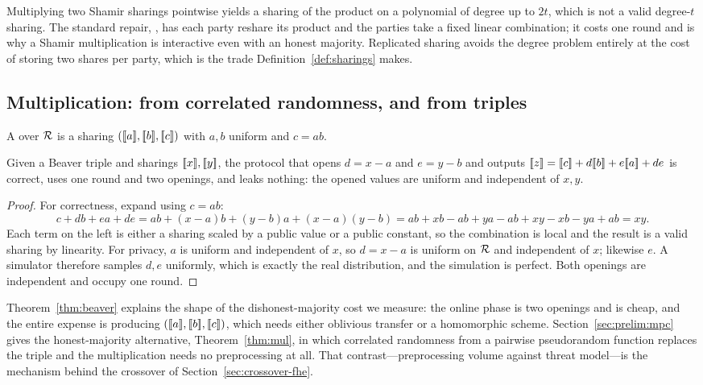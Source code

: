 \begin{remark}
\label{rem:degree}
Multiplying two Shamir sharings pointwise yields a sharing of the product on a
polynomial of degree up to $2t$, which is not a valid degree-$t$ sharing. The
standard repair, , has each party reshare its product and
the parties take a fixed linear combination; it costs one round and is why a
Shamir multiplication is interactive even with an honest majority. Replicated
sharing avoids the degree problem entirely at the cost of storing two shares per
party, which is the trade Definition~\ref{def:sharings} makes.
\end{remark}

\subsection{Multiplication: from correlated randomness, and from triples}
\label{sec:found:mul}

\begin{definition}
\label{def:beaver}
A  over $\mathcal{R}$ is a sharing $([\![a]\!],[\![b]\!],[\![c]\!])$ with
$a,b$ uniform and $c = ab$.
\end{definition}

\begin{theorem}
\label{thm:beaver}
Given a Beaver triple and sharings $[\![x]\!],[\![y]\!]$, the protocol that opens
$d = x - a$ and $e = y - b$ and outputs
$\shr{z} = \shr{c} + d\shr{b} + e\shr{a} + de$
is correct, uses one round and two openings, and leaks nothing: the opened values
are uniform and independent of $x,y$.
\end{theorem}

\begin{proof}
For correctness, expand using $c = ab$:
\[
  c + db + ea + de = ab + (x-a)b + (y-b)a + (x-a)(y-b)
  = ab + xb - ab + ya - ab + xy - xb - ya + ab = xy .
\]
Each term on the left is either a sharing scaled by a public value or a public
constant, so the combination is local and the result is a valid sharing by
linearity. For privacy, $a$ is uniform and independent of $x$, so $d = x-a$ is
uniform on $\mathcal{R}$ and independent of $x$; likewise $e$. A simulator therefore
samples $d,e$ uniformly, which is exactly the real distribution, and the
simulation is perfect. Both openings are independent and occupy one round.
\end{proof}

Theorem~\ref{thm:beaver} explains the shape of the dishonest-majority cost we
measure: the online phase is two openings and is cheap, and the entire expense is
producing $([\![a]\!],[\![b]\!],[\![c]\!])$, which needs either oblivious transfer or a
homomorphic scheme. Section~\ref{sec:prelim:mpc} gives the honest-majority
alternative, Theorem~\ref{thm:mul}, in which correlated randomness from a pairwise
pseudorandom function replaces the triple and the multiplication needs no
preprocessing at all. That contrast---preprocessing volume against threat
model---is the mechanism behind the crossover of
Section~\ref{sec:crossover-fhe}.

